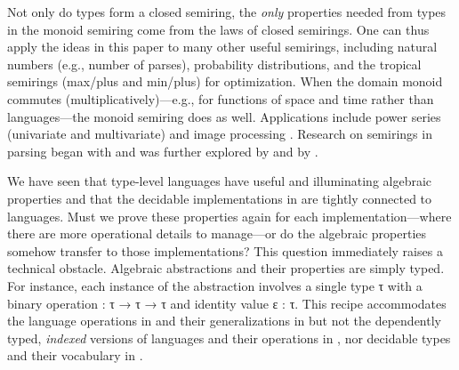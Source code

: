 \documentclass[acmsmall,screen,timestamp,anonymous,review]{acmart}
\begin{document}
Not only do types form a closed semiring, the \emph{only} properties needed from types in the monoid semiring come from the laws of closed semirings.
One can thus apply the ideas in this paper to many other useful semirings, including natural numbers (e.g., number of parses), probability distributions, and the tropical semirings (max/plus and min/plus) for optimization.
When the domain monoid commutes (multiplicatively)---e.g., for functions of space and time rather than languages---the monoid semiring does as well.
Applications include power series (univariate and multivariate) and image processing \citep{Elliott2019-convolution}.
Research on semirings in parsing began with \citet{Chomsky1959CFL} and was further explored by \citet{Goodman1998PIO, Goodman1999SP} and by \citet{Liu2004}.


\rnc{}

We have seen that type-level languages have useful and illuminating algebraic properties and that the decidable implementations in  are tightly connected to languages.
Must we prove these properties again for each implementation---where there are more operational details to manage---or do the algebraic properties somehow transfer to those implementations?
This question immediately raises a technical obstacle.
Algebraic abstractions and their properties are simply typed.
For instance, each instance of the  abstraction involves a single type \AB τ with a binary operation { \AK : \AB τ \AK → \AB τ \AK → \AB τ} and identity value {\AB ε \AK : \AB τ}.
This recipe accommodates the language operations in  and their generalizations in  but not the dependently typed, \emph{indexed} versions of languages and their operations in , nor decidable types and their vocabulary in .
\end{document}
